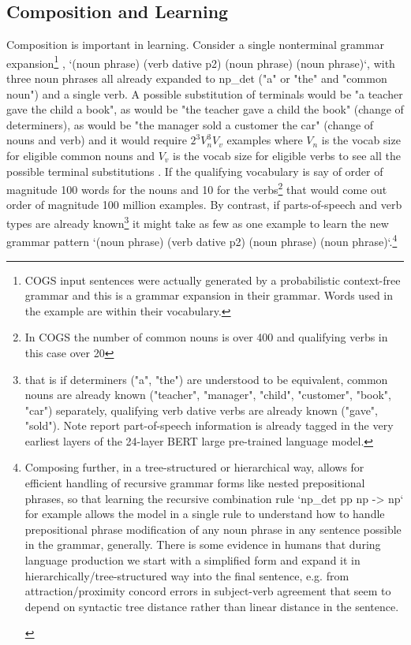 \documentclass[11pt]{article}
\begin{document}
\subsection{Composition and Learning}
\label{composition_and_learning}
Composition is important in learning. Consider a single nonterminal grammar expansion\footnote{COGS input sentences were actually generated by a probabilistic context-free grammar and this is a grammar expansion in their grammar. Words used in the example are within their vocabulary.} , `(noun phrase) (verb dative p2) (noun phrase) (noun phrase)`, with three noun phrases all already expanded to np\_det ("a" or "the" and "common noun") and a single verb. A possible substitution of terminals would be "a teacher gave the child a book", as would be "the teacher gave a child the book" (change of determiners), as would be "the manager sold a customer the car" (change of nouns and verb) and it would require $2^3 V_n^3V_v $ examples where $V_n$ is the vocab size for eligible common nouns and $V_v$ is the vocab size for eligible verbs to see all the possible terminal substitutions . If the qualifying vocabulary is say of order of magnitude 100 words for the nouns and 10 for the verbs\footnote{In COGS the number of common nouns is over 400 and qualifying verbs in this case over 20} that would come out order of magnitude 100 million examples. By contrast, if parts-of-speech and verb types are already known\footnote{that is if determiners ("a", "the") are understood to be equivalent, common nouns are already known ("teacher", "manager", "child", "customer", "book", "car") separately, qualifying verb dative verbs are already known ("gave", "sold"). Note \cite{tenney2019bertrediscoversclassicalnlp} report part-of-speech information is already tagged in the very earliest layers of the 24-layer BERT large pre-trained language model.} it might take as few as one example to learn the new grammar pattern `(noun phrase) (verb dative p2) (noun phrase) (noun phrase)`.\footnote{\begin{footnotesize}Composing further, in a tree-structured or hierarchical way, allows for efficient handling of recursive grammar forms like nested prepositional phrases, so that learning the recursive combination rule `np\_det pp np -> np` for example allows the model in a single rule to understand how to handle prepositional phrase modification of any noun phrase in any sentence possible in the grammar, generally. 
There is some evidence in humans that during language production we start with a simplified form and expand it in hierarchically/tree-structured way into the final sentence, e.g. from attraction/proximity concord errors in subject-verb agreement that seem to depend on syntactic tree distance rather than linear distance in the sentence\cite{FRANCK2006173}\cite{VIGLIOCCO1998B13}.

\end{footnotesize}}
\end{document}
